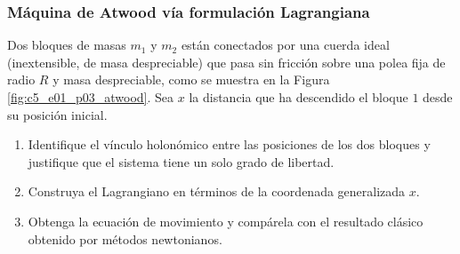 \subsubsection{Máquina de Atwood vía formulación Lagrangiana}

Dos bloques de masas $m_1$ y $m_2$ están conectados por una cuerda ideal (inextensible, de masa despreciable) que pasa sin fricción sobre una polea fija de radio $R$ y masa despreciable, como se muestra en la Figura \ref{fig:c5_e01_p03_atwood}. Sea $x$ la distancia que ha descendido el bloque $1$ desde su posición inicial.

\begin{enumerate}
    \item Identifique el vínculo holonómico entre las posiciones de los dos bloques y justifique que el sistema tiene un solo grado de libertad.
    \item Construya el Lagrangiano en términos de la coordenada generalizada $x$.
    \item Obtenga la ecuación de movimiento y compárela con el resultado clásico obtenido por métodos newtonianos.
\end{enumerate}

